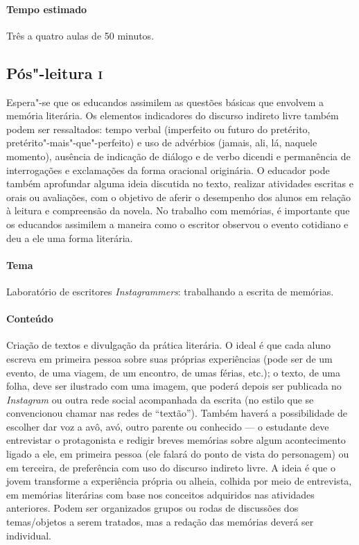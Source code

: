 \documentclass{article}
\begin{document}
\paragraph{Tempo estimado} Três a quatro aulas de 50 minutos.

\subsection{Pós"-leitura \textsc{i}}

\bnccativividadesposleitura


Espera"-se que os educandos assimilem as questões básicas que envolvem
a memória literária. Os elementos indicadores do discurso indireto livre
também podem ser ressaltados: tempo verbal (imperfeito ou futuro do
pretérito, pretérito"-mais"-que"-perfeito) e uso de advérbios (jamais, ali,
lá, naquele momento), ausência de indicação de diálogo e de verbo
dicendi e permanência de interrogações e exclamações da forma oracional
originária. O educador pode também aprofundar alguma ideia discutida no
texto, realizar atividades escritas e orais ou avaliações, com o
objetivo de aferir o desempenho dos alunos em relação à leitura e
compreensão da novela. No trabalho com memórias, é importante que os
educandos assimilem a maneira como o escritor observou o evento
cotidiano e deu a ele uma forma literária.

\paragraph{Tema} Laboratório de escritores \emph{Instagrammers}: trabalhando a escrita de memórias.

\paragraph{Conteúdo} Criação de textos e divulgação da prática literária.
O ideal é que cada aluno escreva em primeira pessoa sobre suas próprias
experiências (pode ser de um evento, de uma viagem, de um encontro, de
umas férias, etc.); o texto, de uma folha, deve ser ilustrado com uma
imagem, que poderá depois ser publicada no \emph{Instagram} ou outra
rede social acompanhada da escrita (no estilo que se convencionou chamar
nas redes de ``textão''). Também haverá a possibilidade de escolher dar
voz a avô, avó, outro parente ou conhecido --- o estudante deve
entrevistar o protagonista e redigir breves memórias sobre algum
acontecimento ligado a ele, em primeira pessoa (ele falará do ponto de
vista do personagem) ou em terceira, de preferência com uso do discurso
indireto livre. A ideia é que o jovem transforme a experiência própria
ou alheia, colhida por meio de entrevista, em memórias literárias com
base nos conceitos adquiridos nas atividades anteriores. Podem ser
organizados grupos ou rodas de discussões dos temas/objetos a serem
tratados, mas a redação das memórias deverá ser individual.
\end{document}
